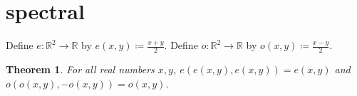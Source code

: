 \documentclass{article}
\newtheorem{theorem}{Theorem}
\begin{document}
\section{spectral}
Define $e:\mathbb{R}^2\to\mathbb{R}$ by $e(x,y)\coloneqq\frac{x+y}{2}$.
Define $o:\mathbb{R}^2\to\mathbb{R}$ by $o(x,y)\coloneqq\frac{x-y}{2}$.
\begin{theorem}\label{thm:RS04}
For all real numbers $x,y$, $e(e(x,y),e(x,y))=e(x,y)$ and $o(o(x,y),-o(x,y))=o(x,y)$.
\end{theorem}
\end{document}
